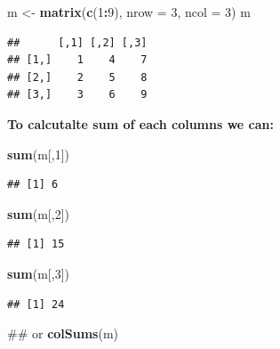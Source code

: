 \documentclass[]{article}
\newenvironment{Shaded}{\begin{snugshade}}{\end{snugshade}}
\newcommand{\KeywordTok}[1]{\textcolor[rgb]{0.13,0.29,0.53}{\textbf{#1}}}
\newcommand{\DataTypeTok}[1]{\textcolor[rgb]{0.13,0.29,0.53}{#1}}
\newcommand{\DecValTok}[1]{\textcolor[rgb]{0.00,0.00,0.81}{#1}}
\newcommand{\StringTok}[1]{\textcolor[rgb]{0.31,0.60,0.02}{#1}}
\newcommand{\OperatorTok}[1]{\textcolor[rgb]{0.81,0.36,0.00}{\textbf{#1}}}
\newcommand{\NormalTok}[1]{#1}
\begin{document}
\begin{Shaded}
\begin{Highlighting}[]
\NormalTok{m <-}\StringTok{ }\KeywordTok{matrix}\NormalTok{(}\KeywordTok{c}\NormalTok{(}\DecValTok{1}\OperatorTok{:}\DecValTok{9}\NormalTok{), }\DataTypeTok{nrow =} \DecValTok{3}\NormalTok{, }\DataTypeTok{ncol =} \DecValTok{3}\NormalTok{)}
\NormalTok{m}
\end{Highlighting}
\end{Shaded}

\begin{verbatim}
##      [,1] [,2] [,3]
## [1,]    1    4    7
## [2,]    2    5    8
## [3,]    3    6    9
\end{verbatim}

\textbf{To calcutalte sum of each columns we can:}

\begin{Shaded}
\begin{Highlighting}[]
\KeywordTok{sum}\NormalTok{(m[,}\DecValTok{1}\NormalTok{])}
\end{Highlighting}
\end{Shaded}

\begin{verbatim}
## [1] 6
\end{verbatim}

\begin{Shaded}
\begin{Highlighting}[]
\KeywordTok{sum}\NormalTok{(m[,}\DecValTok{2}\NormalTok{])}
\end{Highlighting}
\end{Shaded}

\begin{verbatim}
## [1] 15
\end{verbatim}

\begin{Shaded}
\begin{Highlighting}[]
\KeywordTok{sum}\NormalTok{(m[,}\DecValTok{3}\NormalTok{])}
\end{Highlighting}
\end{Shaded}

\begin{verbatim}
## [1] 24
\end{verbatim}

\begin{Shaded}
\begin{Highlighting}[]
\NormalTok{## or}
 \KeywordTok{colSums}\NormalTok{(m)}
\end{Highlighting}
\end{Shaded}
\end{document}
